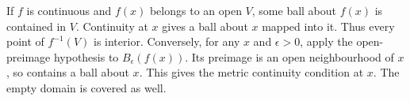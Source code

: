 If $f$ is continuous and $f(x)$ belongs to an open $V$, some ball about $f(x)$ is contained in $V$. Continuity at $x$ gives a ball about $x$ mapped into it. Thus every point of $f^{-1}(V)$ is interior. Conversely, for any $x$ and $\epsilon>0$, apply the open-preimage hypothesis to $B_\epsilon(f(x))$. Its preimage is an open neighbourhood of $x$, so contains a ball about $x$. This gives the metric continuity condition at $x$. The empty domain is covered as well.
